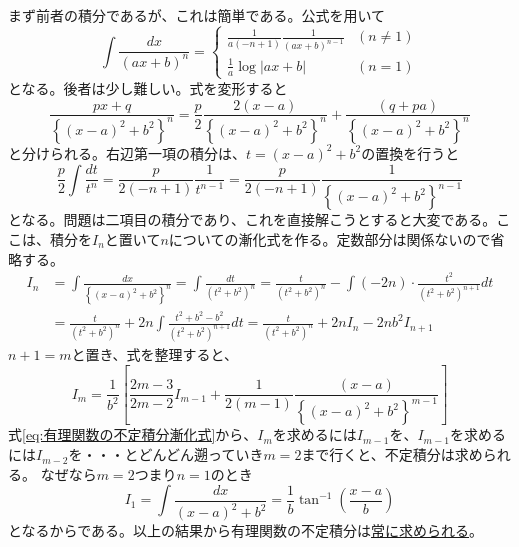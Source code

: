 \documentclass[a4j,dvipdfmx]{jsarticle}
\begin{document}
                まず前者の積分であるが、これは簡単である。公式を用いて
                \begin{equation}
                    \int \frac{dx}{(ax+b)^n} = \left\{\begin{array}{lc}
                        \displaystyle \frac{1}{a(-n+1)}\frac{1}{(ax+b)^{n-1}} & (n\neq 1) \\
                        \displaystyle \frac{1}{a}\log|ax+b| & (n=1)
                    \end{array}\right.
                \end{equation}
                となる。後者は少し難しい。式を変形すると
                \begin{equation*}
                    \frac{px+q}{\left\{(x-a)^2+b^2\right\}^n}=\frac{p}{2}\frac{2(x-a)}{\left\{(x-a)^2+b^2\right\}^n}+\frac{(q+pa)}{\left\{(x-a)^2+b^2\right\}^n}
                \end{equation*}
                と分けられる。右辺第一項の積分は、$t=(x-a)^2+b^2$の置換を行うと
                \begin{equation*}
                    \frac{p}{2}\int \frac{dt}{t^n}=\frac{p}{2(-n+1)}\frac{1}{t^{n-1}}=\frac{p}{2(-n+1)}\frac{1}{\left\{(x-a)^2+b^2\right\}^{n-1}}
                \end{equation*}
                となる。問題は二項目の積分であり、これを直接解こうとすると大変である。ここは、積分を$I_n$と置いて$n$についての漸化式を作る。定数部分は関係ないので省略する。
                \begin{align*}
                    I_n &= \int \frac{dx}{\left\{(x-a)^2+b^2\right\}^n}=\int \frac{dt}{(t^2+b^2)^n} = \frac{t}{(t^2+b^2)^n} - \int (-2n)\cdot\frac{t^2}{(t^2+b^2)^{n+1}}dt\\
                        &= \frac{t}{(t^2+b^2)^n}+2n\int \frac{t^2+b^2-b^2}{(t^2+b^2)^{n+1}}dt=\frac{t}{(t^2+b^2)^n}+2nI_n-2nb^2I_{n+1}
                \end{align*}
                $n+1=m$と置き、式を整理すると、
                \begin{equation}
                    I_m = \frac{1}{b^2}\left[\frac{2m-3}{2m-2}I_{m-1}+\frac{1}{2(m-1)}\frac{(x-a)}{\left\{(x-a)^2+b^2\right\}^{m-1}}\right] \label{eq:有理関数の不定積分漸化式}
                \end{equation}
                \clearpage
                式\ref{eq:有理関数の不定積分漸化式}から、$I_m$を求めるには$I_{m-1}$を、$I_{m-1}$を求めるには$I_{m-2}$を・・・とどんどん遡っていき$m=2$まで行くと、不定積分は求められる。
                なぜなら$m=2$つまり$n=1$のとき
                \begin{equation*}
                    I_1 = \int \frac{dx}{(x-a)^2+b^2}=\frac{1}{b}\tan^{-1}\left(\frac{x-a}{b}\right) 
                \end{equation*}
                となるからである。以上の結果から有理関数の不定積分は\underline{常に求められる}。\\
\end{document}
